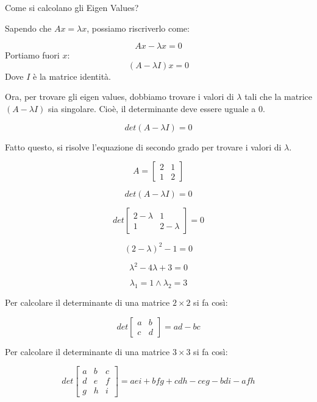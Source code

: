 \begin{domanda}
    Come si calcolano gli Eigen Values?

    Sapendo che $Ax = \lambda x$, possiamo riscriverlo come:

    $$
        Ax - \lambda x = 0
    $$
    Portiamo fuori $x$:
    $$
        (A - \lambda I)x = 0
    $$
    Dove $I$ è la matrice identità.

    Ora, per trovare gli eigen values, dobbiamo trovare i valori di $\lambda$ tali che la matrice $(A - \lambda I)$ sia singolare. Cioè, il determinante deve essere uguale a 0.

    $$
        det(A - \lambda I) = 0
    $$

    Fatto questo, si risolve l'equazione di secondo grado per trovare i valori di $\lambda$.

    \begin{esempio}
        $$
            A = \begin{bmatrix}
                2 & 1 \\
                1 & 2
            \end{bmatrix}
        $$

        $$
            det(A - \lambda I) = 0
        $$

        $$
            det\begin{bmatrix}
                2 - \lambda & 1            \\
                1           & 2 - \lambda
            \end{bmatrix} = 0
        $$

        $$
            (2 - \lambda)^2 - 1 = 0
        $$

        $$
            \lambda^2 - 4\lambda + 3 = 0
        $$

        $$
            \lambda_1 = 1 \land \lambda_2 = 3
        $$
    \end{esempio}

    Per calcolare il determinante di una matrice $2 \times 2$ si fa così:

    $$
        det\begin{bmatrix}
            a & b \\
            c & d
        \end{bmatrix} = ad - bc
    $$

    Per calcolare il determinante di una matrice $3 \times 3$ si fa così:

    $$
        det\begin{bmatrix}
            a & b & c \\
            d & e & f \\
            g & h & i
        \end{bmatrix} = aei + bfg + cdh - ceg - bdi - afh
    $$


\end{domanda}
